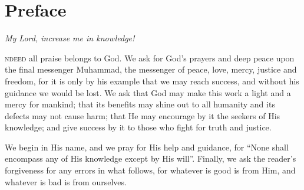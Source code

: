 
 \chapter*{Preface}

\textsf{\textsl{My Lord, increase me in knowledge!}}
\newline
 

{}\textsc{ndeed} all praise belongs to God. We ask for God's prayers and deep peace upon the final 
messenger Muhammad, the messenger of peace, love, mercy, justice and freedom, for it is only by his example that we may reach success, and without his guidance we would be lost. We ask that God may make this work a light and a mercy for mankind; that its benefits may shine out to all humanity and its defects may not cause harm; that He may encourage by it the seekers of His knowledge; and give success by it to those who fight for truth and justice.
 
 We begin in His name, and we pray for His help and guidance, for ``None shall encompass any of His knowledge except by His will''.  Finally, we ask the reader's forgiveness for any errors in what follows, for whatever is good is from Him, and whatever is bad is from ourselves. 